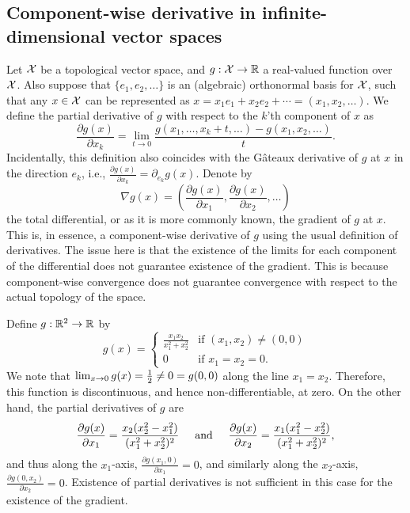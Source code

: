 \subsection{Component-wise derivative in infinite-dimensional vector spaces}
\label{misc:comwiseder}

Let ${\mathcal X}$ be a topological vector space, and $g:{\mathcal X}\to\mathbb{R}$ a real-valued function over ${\mathcal X}$.
Also suppose that $\{e_1,e_2,\dots\}$ is an (algebraic) orthonormal basis for ${\mathcal X}$, such that any $x\in{\mathcal X}$ can be represented as $x = x_1e_1 + x_2e_2 + \cdots = (x_1,x_2,\dots)$.
We define the partial derivative of $g$ with respect to the $k$'th component of $x$ as
\[
  \frac{\partial g(x)}{\partial x_k}  = \lim_{t\to 0} \frac{g(x_1,\dots,x_k+t,\dots) - g(x_1,x_2,\dots)}{t}.
\]
Incidentally, this definition also coincides with the Gâteaux derivative of $g$ at $x$ in the direction $e_k$, i.e., $\frac{\partial g(x)}{\partial x_k} = \partial_{e_k}g(x)$.
Denote by 
\[
  \nabla g(x) = \left(
  \frac{\partial g(x)}{\partial x_1}, 
  \frac{\partial g(x)}{\partial x_2},
  \dots
  \right)
\]
the total differential, or as it is more commonly known, the gradient of $g$ at $x$.
This is, in essence, a component-wise derivative of $g$ using the usual definition of derivatives.
The issue here is that the existence of the limits for each component of the differential does not guarantee existence of the gradient.
This is because component-wise convergence does not guarantee convergence with respect to the actual topology of the  space.

\begin{example}
Define $g:\mathbb{R}^2\to\mathbb{R}$ by
\[
  g(x) = 
  \begin{cases}
    \displaystyle\frac{x_1x_2}{x_1^2 + x_2^2} &\text{if } (x_1,x_2) \neq (0,0) \\
    0 &\text{if } x_1=x_2=0.
  \end{cases}
\]
We note that $\lim_{x\to 0} g(x) = \frac{1}{2} \neq 0 = g(0,0)$ along the line $x_1 = x_2$.
Therefore, this function is discontinuous, and hence non-differentiable, at zero.
On the other hand, the partial derivatives of $g$ are 
\[
  \frac{\partial g(x)}{\partial x_1} = \frac{x_2(x_2^2-x_1^2)}{(x_1^2+x_2^2)^2}
  \hspace{0.5cm}\text{and}\hspace{0.5cm}
  \frac{\partial g(x)}{\partial x_2} = \frac{x_1(x_1^2-x_2^2)}{(x_1^2+x_2^2)^2},
\]
and thus along the $x_1$-axis, $\frac{\partial g(x_1,0)}{\partial x_1} = 0$, and similarly along the $x_2$-axis, $\frac{\partial g(0,x_2)}{\partial x_2} = 0$.
Existence of partial derivatives is not sufficient in this case for the existence of the gradient.

\end{example}


